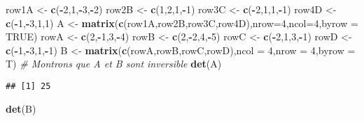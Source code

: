 \documentclass[]{article}
\newenvironment{Shaded}{\begin{snugshade}}{\end{snugshade}}
\newcommand{\CommentTok}[1]{\textcolor[rgb]{0.56,0.35,0.01}{\textit{#1}}}
\newcommand{\DataTypeTok}[1]{\textcolor[rgb]{0.13,0.29,0.53}{#1}}
\newcommand{\DecValTok}[1]{\textcolor[rgb]{0.00,0.00,0.81}{#1}}
\newcommand{\KeywordTok}[1]{\textcolor[rgb]{0.13,0.29,0.53}{\textbf{#1}}}
\newcommand{\NormalTok}[1]{#1}
\newcommand{\OperatorTok}[1]{\textcolor[rgb]{0.81,0.36,0.00}{\textbf{#1}}}
\newcommand{\OtherTok}[1]{\textcolor[rgb]{0.56,0.35,0.01}{#1}}
\newcommand{\StringTok}[1]{\textcolor[rgb]{0.31,0.60,0.02}{#1}}
\begin{document}
\begin{Shaded}
\begin{Highlighting}[]
\NormalTok{row1A <-}\StringTok{ }\KeywordTok{c}\NormalTok{(}\OperatorTok{-}\DecValTok{2}\NormalTok{,}\DecValTok{1}\NormalTok{,}\OperatorTok{-}\DecValTok{3}\NormalTok{,}\OperatorTok{-}\DecValTok{2}\NormalTok{)}
\NormalTok{row2B <-}\StringTok{ }\KeywordTok{c}\NormalTok{(}\DecValTok{1}\NormalTok{,}\DecValTok{2}\NormalTok{,}\DecValTok{1}\NormalTok{,}\OperatorTok{-}\DecValTok{1}\NormalTok{)}
\NormalTok{row3C <-}\StringTok{ }\KeywordTok{c}\NormalTok{(}\OperatorTok{-}\DecValTok{2}\NormalTok{,}\DecValTok{1}\NormalTok{,}\DecValTok{1}\NormalTok{,}\OperatorTok{-}\DecValTok{1}\NormalTok{)}
\NormalTok{row4D <-}\StringTok{ }\KeywordTok{c}\NormalTok{(}\OperatorTok{-}\DecValTok{1}\NormalTok{,}\OperatorTok{-}\DecValTok{3}\NormalTok{,}\DecValTok{1}\NormalTok{,}\DecValTok{1}\NormalTok{)}
\NormalTok{A <-}\StringTok{ }\KeywordTok{matrix}\NormalTok{(}\KeywordTok{c}\NormalTok{(row1A,row2B,row3C,row4D),}\DataTypeTok{nrow=}\DecValTok{4}\NormalTok{,}\DataTypeTok{ncol=}\DecValTok{4}\NormalTok{,}\DataTypeTok{byrow =} \OtherTok{TRUE}\NormalTok{)}
\NormalTok{rowA <-}\StringTok{ }\KeywordTok{c}\NormalTok{(}\DecValTok{2}\NormalTok{,}\OperatorTok{-}\DecValTok{1}\NormalTok{,}\DecValTok{3}\NormalTok{,}\OperatorTok{-}\DecValTok{4}\NormalTok{)}
\NormalTok{rowB <-}\StringTok{ }\KeywordTok{c}\NormalTok{(}\DecValTok{2}\NormalTok{,}\OperatorTok{-}\DecValTok{2}\NormalTok{,}\DecValTok{4}\NormalTok{,}\OperatorTok{-}\DecValTok{5}\NormalTok{)}
\NormalTok{rowC <-}\StringTok{ }\KeywordTok{c}\NormalTok{(}\OperatorTok{-}\DecValTok{2}\NormalTok{,}\DecValTok{1}\NormalTok{,}\DecValTok{3}\NormalTok{,}\OperatorTok{-}\DecValTok{1}\NormalTok{)}
\NormalTok{rowD <-}\StringTok{ }\KeywordTok{c}\NormalTok{(}\OperatorTok{-}\DecValTok{1}\NormalTok{,}\OperatorTok{-}\DecValTok{3}\NormalTok{,}\DecValTok{1}\NormalTok{,}\OperatorTok{-}\DecValTok{1}\NormalTok{)}
\NormalTok{B <-}\StringTok{ }\KeywordTok{matrix}\NormalTok{(}\KeywordTok{c}\NormalTok{(rowA,rowB,rowC,rowD),}\DataTypeTok{ncol =} \DecValTok{4}\NormalTok{,}\DataTypeTok{nrow =} \DecValTok{4}\NormalTok{,}\DataTypeTok{byrow =}\NormalTok{ T)}
\CommentTok{# Montrons que  A et B sont inversible}
\KeywordTok{det}\NormalTok{(A)}
\end{Highlighting}
\end{Shaded}

\begin{verbatim}
## [1] 25
\end{verbatim}

\begin{Shaded}
\begin{Highlighting}[]
\KeywordTok{det}\NormalTok{(B)}
\end{Highlighting}
\end{Shaded}
\end{document}
